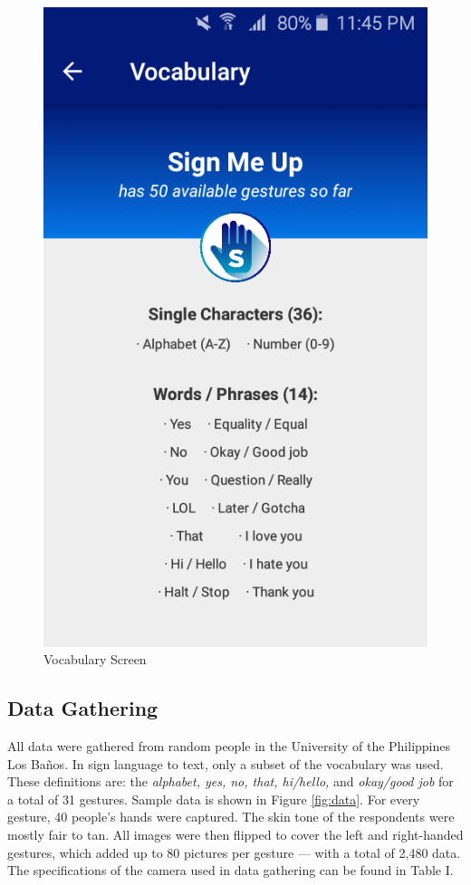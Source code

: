 \documentclass[journal]{./IEEE/IEEEtran}
\begin{document}
\begin{figure}[ht!]
    \centering
    \includegraphics[width=0.75\linewidth]{./images/screen_vocabulary.png}
    \caption{Vocabulary Screen}
    \label{fig:vocabulary}
\end{figure}

\subsection{Data Gathering}
All data were gathered from random people in the University of the Philippines Los Ba\~{n}os. In sign language to text, only a subset of the vocabulary was used. These definitions are: the \textit{alphabet, yes, no, that, hi/hello,} and \textit{okay/good job} for a total of 31 gestures. Sample data is shown in Figure \ref{fig:data}.
\newline
\indent For every gesture, 40 people's hands were captured. The skin tone of the respondents were mostly fair to tan. All images were then flipped to cover the left and right-handed gestures, which added up to 80 pictures per gesture --- with a total of 2,480 data.
\newline
\indent The specifications of the camera used in data gathering can be found in Table I.
\end{document}
